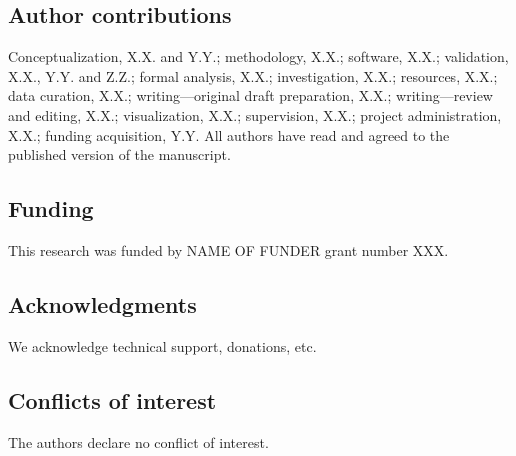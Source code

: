 
\subsection*{Author contributions}
Conceptualization, X.X. and Y.Y.; methodology, X.X.; software, X.X.; validation, X.X., Y.Y. and Z.Z.; formal analysis, X.X.; investigation, X.X.; resources, X.X.; data curation, X.X.; writing---original draft preparation, X.X.; writing---review and editing, X.X.; visualization, X.X.; supervision, X.X.; project administration, X.X.; funding acquisition, Y.Y. All authors have read and agreed to the published version of the manuscript.

\subsection*{Funding}
This research was funded by NAME OF FUNDER grant number XXX.

\subsection*{Acknowledgments}
We acknowledge technical support, donations, etc.

\subsection*{Conflicts of interest} The authors declare no conflict of interest.